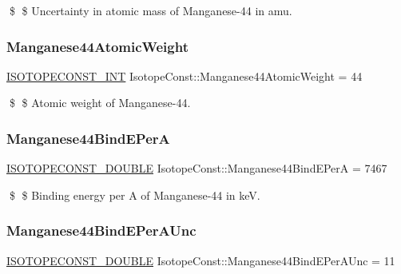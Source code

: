\$ \$ Uncertainty in atomic mass of Manganese-\/44 in amu. \mbox{\label{group___isotope_const-_manganese-_mn44_gacaa184153ea22dafe54a68f2df14e8d7}} 
\subsubsection{\texorpdfstring{Manganese44\+Atomic\+Weight}{Manganese44AtomicWeight}}
{\footnotesize\ttfamily \mbox{\hyperlink{group___isotope_const-_macros_ga5f18360b3e99483a35c32d789e62621c}{I\+S\+O\+T\+O\+P\+E\+C\+O\+N\+S\+T\+\_\+\+I\+NT}} Isotope\+Const\+::\+Manganese44\+Atomic\+Weight = 44}

\$ \$ Atomic weight of Manganese-\/44. \mbox{\label{group___isotope_const-_manganese-_mn44_ga4a05b296a784d0d180a8c6f15989e957}} 
\subsubsection{\texorpdfstring{Manganese44\+Bind\+E\+PerA}{Manganese44BindEPerA}}
{\footnotesize\ttfamily \mbox{\hyperlink{group___isotope_const-_macros_ga8f45a7272ce02c0b4c65c44636ed719a}{I\+S\+O\+T\+O\+P\+E\+C\+O\+N\+S\+T\+\_\+\+D\+O\+U\+B\+LE}} Isotope\+Const\+::\+Manganese44\+Bind\+E\+PerA = 7467}

\$ \$ Binding energy per A of Manganese-\/44 in keV. \mbox{\label{group___isotope_const-_manganese-_mn44_ga92853712bb9d2d9d7efb8772261d764c}} 
\subsubsection{\texorpdfstring{Manganese44\+Bind\+E\+Per\+A\+Unc}{Manganese44BindEPerAUnc}}
{\footnotesize\ttfamily \mbox{\hyperlink{group___isotope_const-_macros_ga8f45a7272ce02c0b4c65c44636ed719a}{I\+S\+O\+T\+O\+P\+E\+C\+O\+N\+S\+T\+\_\+\+D\+O\+U\+B\+LE}} Isotope\+Const\+::\+Manganese44\+Bind\+E\+Per\+A\+Unc = 11}

